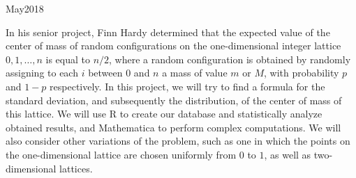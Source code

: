 \documentclass[11pt, twoside, reqno]{book}
\begin{document}
    {May}{2018}

\abstr

In his senior project, Finn Hardy determined that the expected value of the center of mass of random configurations on the one-dimensional integer lattice $0, 1, \dots , n$ is equal to $n/2$, where a random configuration is obtained by randomly assigning to each $i$ between 0 and $n$ a mass of value $m$ or $M$, with probability $p$ and $1-p$ respectively. In this project, we will try to find a formula for the standard deviation, and subsequently the distribution, of the center of mass of this lattice. We will use R to create our database and statistically analyze obtained results, and Mathematica to perform complex computations. We will also consider other variations of the problem, such as one in which the points on the one-dimensional lattice are chosen uniformly from $0$ to $1$, as well as two-dimensional lattices.

\tableofcontents





\dedic

\acknowl

\startmain


\intro
\end{document}
